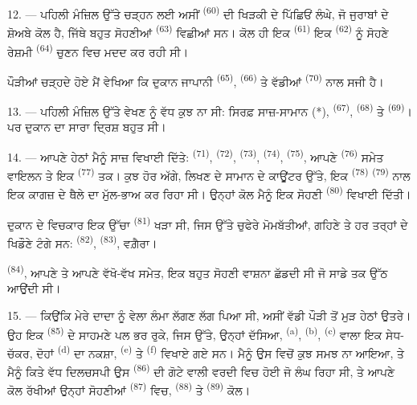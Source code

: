 12. --- ਪਹਿਲੀ ਮੰਜ਼ਿਲ ਉੱਤੇ ਚੜ੍ਹਨ ਲਈ ਅਸੀਂ  \textsuperscript{(60)}
ਦੀ ਖਿੜਕੀ ਦੇ ਪਿੱਛਿਓਂ ਲੰਘੇ, ਜੋ ਜੁਰਾਬਾਂ ਦੇ ਸ਼ੋਅਬੇ ਕੋਲ ਹੈ, ਜਿੱਥੇ ਬਹੁਤ ਸੋਹਣੀਆਂ
 \textsuperscript{(63)} ਵਿਛੀਆਂ ਸਨ। ਕੋਲ ਹੀ ਇਕ
 \textsuperscript{(61)} ਇਕ 
\textsuperscript{(62)} ਨੂੰ ਸੋਹਣੇ ਰੇਸ਼ਮੀ  \textsuperscript{(64)} ਚੁਣਨ
ਵਿਚ ਮਦਦ ਕਰ ਰਹੀ ਸੀ।

ਪੌੜੀਆਂ ਚੜ੍ਹਦੇ ਹੋਏ ਮੈਂ ਵੇਖਿਆ ਕਿ ਦੁਕਾਨ ਜਾਪਾਨੀ 
\textsuperscript{(65)},  \textsuperscript{(66)} ਤੇ ਵੱਡੀਆਂ
 \textsuperscript{(70)} ਨਾਲ ਸਜੀ ਹੈ।

13. --- ਪਹਿਲੀ ਮੰਜ਼ਿਲ ਉੱਤੇ ਵੇਖਣ ਨੂੰ ਵੱਧ ਕੁਝ ਨਾ ਸੀ: ਸਿਰਫ਼ ਸਾਜ਼-ਸਾਮਾਨ (*),
 \textsuperscript{(67)}, 
\textsuperscript{(68)} ਤੇ  \textsuperscript{(69)}। ਪਰ ਦੁਕਾਨ ਦਾ
ਸਾਰਾ ਦ੍ਰਿਸ਼ ਬਹੁਤ  ਸੀ।

14. --- ਆਪਣੇ ਹੇਠਾਂ ਮੈਨੂੰ ਸਾਜ਼ ਵਿਖਾਈ ਦਿੱਤੇ: 
\textsuperscript{(71)},  \textsuperscript{(72)},
 \textsuperscript{(73)},  \textsuperscript{(74)},
 \textsuperscript{(75)}, ਆਪਣੇ  \textsuperscript{(76)}
ਸਮੇਤ ਵਾਇਲਨ ਤੇ ਇਕ  \textsuperscript{(77)} ਤਕ। ਕੁਝ ਹੋਰ ਅੱਗੇ, ਲਿਖਣ ਦੇ
ਸਾਮਾਨ ਦੇ ਕਾਊਂਟਰ ਉੱਤੇ, ਇਕ  \textsuperscript{(78)}
 \textsuperscript{(79)} ਨਾਲ ਇਕ ਕਾਗਜ਼ ਦੇ ਥੈਲੇ ਦਾ ਮੁੱਲ-ਭਾਅ ਕਰ
ਰਿਹਾ ਸੀ। ਉਨ੍ਹਾਂ ਕੋਲ ਮੈਨੂੰ ਇਕ ਸੋਹਣੀ  \textsuperscript{(80)}
ਵਿਖਾਈ ਦਿੱਤੀ।

ਦੁਕਾਨ ਦੇ ਵਿਚਕਾਰ ਇਕ ਉੱਚਾ  \textsuperscript{(81)} ਖੜਾ ਸੀ,
ਜਿਸ ਉੱਤੇ ਚੁਫੇਰੇ ਮੋਮਬੱਤੀਆਂ, ਗਹਿਣੇ ਤੇ ਹਰ ਤਰ੍ਹਾਂ ਦੇ ਖਿਡੌਣੇ ਟੰਗੇ ਸਨ:
 \textsuperscript{(82)}, 
\textsuperscript{(83)}, ਵਗ਼ੈਰਾ।

 \textsuperscript{(84)}, ਆਪਣੇ  ਤੇ
ਆਪਣੇ ਵੱਖੋ-ਵੱਖ  ਸਮੇਤ, ਇਕ ਬਹੁਤ ਸੋਹਣੀ ਵਾਸ਼ਨਾ ਛੱਡਦੀ ਸੀ ਜੋ ਸਾਡੇ ਤਕ ਉੱਠ
ਆਉਂਦੀ ਸੀ।

\VUsaut{3.4mm}
\VUsaut{2.8mm}

15. --- ਕਿਉਂਕਿ ਮੇਰੇ ਦਾਦਾ ਨੂੰ ਵੇਲਾ ਲੰਮਾ ਲੱਗਣ ਲੱਗ ਪਿਆ ਸੀ, ਅਸੀਂ ਵੱਡੀ ਪੌੜੀ ਤੋਂ ਮੁੜ
ਹੇਠਾਂ ਉਤਰੇ। ਉਹ ਇਕ  \textsuperscript{(85)} ਦੇ ਸਾਹਮਣੇ ਪਲ
ਭਰ ਰੁਕੇ, ਜਿਸ ਉੱਤੇ, ਉਨ੍ਹਾਂ ਦੱਸਿਆ,  \textsuperscript{(a)},
 \textsuperscript{(b)}, 
\textsuperscript{(c)}  ਵਾਲਾ ਇਕ ਸੇਧ-ਚੱਕਰ, ਦੋਹਾਂ
 \textsuperscript{(d)} ਦਾ ਨਕਸ਼ਾ, 
\textsuperscript{(e)} ਤੇ  \textsuperscript{(f)} ਵਿਖਾਏ ਗਏ ਸਨ। ਮੈਨੂੰ
ਉਸ ਵਿਚੋਂ ਕੁਝ ਸਮਝ ਨਾ ਆਇਆ, ਤੇ ਮੈਨੂੰ ਕਿਤੇ ਵੱਧ ਦਿਲਚਸਪੀ ਉਸ
 \textsuperscript{(86)} ਦੀ ਗੋਟੇ ਵਾਲੀ ਵਰਦੀ ਵਿਚ ਹੋਈ ਜੋ
ਲੰਘ ਰਿਹਾ ਸੀ, ਤੇ ਆਪਣੇ ਕੋਲ ਰੱਖੀਆਂ ਉਨ੍ਹਾਂ ਸੋਹਣੀਆਂ 
\textsuperscript{(87)} ਵਿਚ,  \textsuperscript{(88)} ਤੇ
 \textsuperscript{(89)} ਕੋਲ।

